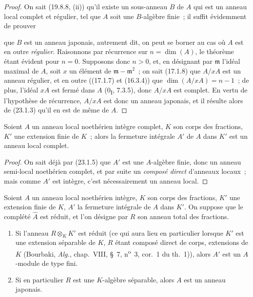 \begin{proof}
On sait (19.8.8, (ii)) qu'il existe un sous-anneau $B$ de $A$ qui est un
anneau local complet et régulier, tel que $A$ soit une $B$-algèbre finie~; il
suffit évidemment de prouver


que $B$ est un anneau japonais, autrement dit, on peut se borner au cas où
$A$ est en outre \emph{régulier}. Raisonnons par récurrence sur
$n=\dim(A)$, le théorème étant évident pour $n=0$. Supposons donc $n>0$, et,
en désignant par $\mathfrak m$ l'idéal maximal de $A$, soit $x$ un élément de
$\mathfrak m-\mathfrak m^2$~; on sait (17.1.8) que $A/xA$ est un anneau
régulier, et en outre ((17.1.7) et (16.3.4)) que
$\dim(A/xA)=n-1$~; de plus, l'idéal $xA$ est fermé dans $A$
(0\textsubscript{I}, 7.3.5), donc $A/xA$ est complet. En vertu de l'hypothèse
de récurrence, $A/xA$ est donc un anneau japonais, et il résulte alors de
(23.1.3) qu'il en est de même de $A$.
\end{proof}

\begin{corollary}[23.1.6]
\label{0.23.1.6-fr}
Soient $A$ un anneau local noethérien intègre complet, $K$ son corps des
fractions, $K'$ une extension finie de $K$~; alors la fermeture intégrale
$A'$ de $A$ dans $K'$ est un anneau local complet.
\end{corollary}

\begin{proof}
On sait déjà par (23.1.5) que $A'$ est une $A$-algèbre finie, donc un anneau
semi-local noethérien complet, et par suite un \emph{composé direct}
d'anneaux locaux~; mais comme $A'$ est intègre, c'est nécessairement un
anneau local.
\end{proof}

\begin{proposition}[23.1.7]
\label{0.23.1.7-fr}
Soient $A$ un anneau local noethérien intègre, $K$ son corps des fractions,
$K'$ une extension finie de $K$, $A'$ la fermeture intégrale de $A$ dans
$K'$. On suppose que le complété $\widehat A$ est réduit, et l'on désigne par
$R$ son anneau total des fractions.
\begin{enumerate}
  \item[(i)] Si l'anneau $R\otimes_KK'$ est réduit (ce qui aura lieu en
  particulier lorsque $K'$ est une extension séparable de $K$, $R$ étant
  composé direct de corps, extensions de $K$ (Bourbaki, \emph{Alg.},
  chap.~VIII, §~7, n\textsuperscript{o}~3, cor.~1 du th.~1)), alors $A'$ est
  un $A$-module de type fini.
  \item[(ii)] Si en particulier $R$ est une $K$-algèbre séparable, alors $A$
  est un anneau japonais.
\end{enumerate}
\end{proposition}

